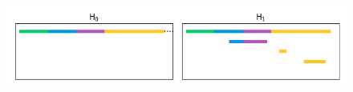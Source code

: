 \begin{figure}[htbp]
  \includegraphics[scale=0.8]{scripts/figures/scalar_barcode_true.png}
\end{figure}

